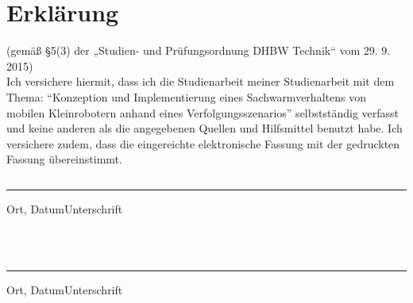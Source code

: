 \pagestyle{scrheadings}
\clearscrheadfoot
{}

\section*{Erklärung}

(gemäß §5(3) der „Studien- und Prüfungsordnung DHBW Technik“ vom 29. 9. 2015)\\
Ich versichere hiermit, dass ich die Studienarbeit meiner Studienarbeit mit dem Thema: \enquote{Konzeption und Implementierung eines Sachwarmverhaltens von mobilen Kleinrobotern anhand eines Verfolgungsszenarios} selbstständig verfasst und keine anderen als die angegebenen Quellen und Hilfsmittel benutzt habe. Ich versichere zudem, dass die eingereichte elektronische Fassung mit der gedruckten Fassung übereinstimmt.\\
\begin{verbatim}
\end{verbatim}
\noindent\rule{\textwidth}{1pt}
\noindent Ort, Datum\hfill\hfill Unterschrift
\begin{verbatim}



\end{verbatim}
\noindent\rule{\textwidth}{1pt}
\noindent Ort, Datum\hfill\hfill Unterschrift